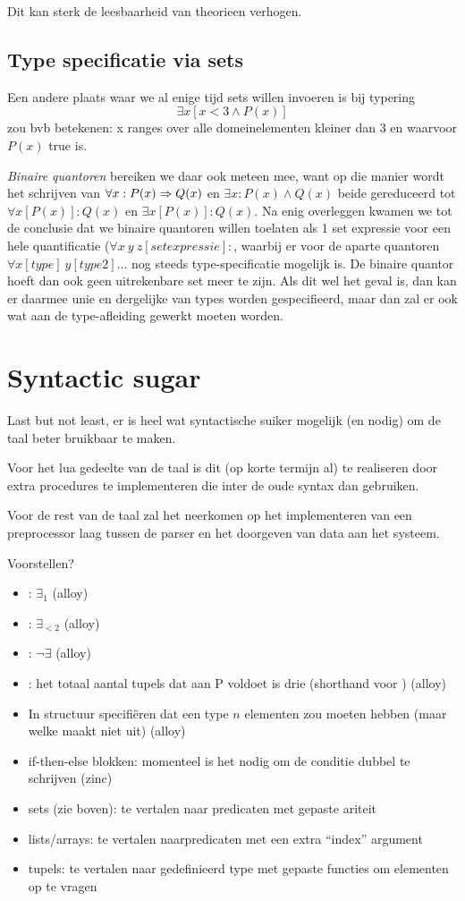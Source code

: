 \documentclass{article}
\begin{document}
Dit kan sterk de leesbaarheid van theorieen verhogen.

\subsection{Type specificatie via sets}
Een andere plaats waar we al enige tijd sets willen invoeren is bij typering
\[\exists x[x<3 \land P(x)]\] zou bvb betekenen: x ranges over alle domeinelementen kleiner dan 3 en waarvoor $P(x)$ true is.

\emph{Binaire quantoren} bereiken we daar ook meteen mee, want op die manier wordt het schrijven van $\forall x: P(x) \Rightarrow Q(x)$ en $\exists x: P(x) \land Q(x)$ beide gereduceerd tot $\forall x[P(x)]: Q(x)$ en $\exists x[P(x)]: Q(x)$.
Na enig overleggen kwamen we tot de conclusie dat we binaire quantoren willen toelaten als 1 set expressie voor een hele quantificatie ($\forall x~y~z[set expressie]:$, waarbij er voor de aparte quantoren $\forall x[type]~y[type2]\ldots$ nog steeds type-specificatie mogelijk is. De binaire quantor hoeft dan ook geen uitrekenbare set meer te zijn. Als dit wel het geval is, dan kan er daarmee unie en dergelijke van types worden gespecifieerd, maar dan zal er ook wat aan de type-afleiding gewerkt moeten worden.


\section{Syntactic sugar}
Last but not least, er is heel wat syntactische suiker mogelijk (en nodig) om de taal beter bruikbaar te maken.

Voor het lua gedeelte van de taal is dit (op korte termijn al) te realiseren door extra procedures te implementeren die inter de oude syntax dan gebruiken.

Voor de rest van de taal zal het neerkomen op het implementeren van een preprocessor laag tussen de parser en het doorgeven van data aan het systeem.

Voorstellen?
\begin{itemize}
  \item {}: $\exists_1$ (alloy)
  \item {}: $\exists_{<2}$ (alloy)
  \item {}: $\lnot \exists$ (alloy)
  \item {}: het totaal aantal tupels dat aan P voldoet is drie (shorthand voor ) (alloy)
  \item In structuur specifi\"eren dat een type $n$ elementen zou moeten hebben (maar welke maakt niet uit) (alloy)
  \item if-then-else blokken: momenteel is het nodig om de conditie dubbel te schrijven (zinc)
  \item sets (zie boven): te vertalen naar predicaten met gepaste ariteit
  \item lists/arrays: te vertalen naarpredicaten met een extra ``index'' argument
  \item tupels: te vertalen naar gedefinieerd type met gepaste functies om elementen op te vragen
\end{itemize}
\end{document}
